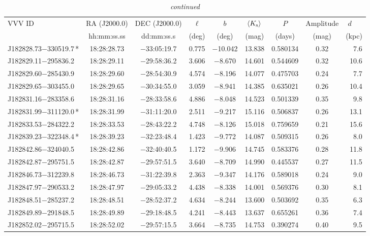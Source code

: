 \begin{table*}
\centering
\caption[]{{\it continued}}
\begin{tabular}{lcccccccr}
\hline \hline
VVV ID & RA (J2000.0)  & DEC (J2000.0) & $\ell$ & $b$ &  $\langle K_{\rm s} \rangle$ & $P$ & Amplitude & $d$~~~ \\
     & hh:mm:ss.ss    & dd:mm:ss.s   &  (deg) & (deg) &   (mag)       & (days) & (mag) & (kpc)   \\
\hline
J182828.73$-$330519.7\,* & 18:28:28.73 & $-$33:05:19.7 &  0.775 & $-$10.042 & 13.838 & 0.580134 & 0.32 & 7.6 \\
J182829.11$-$295836.2 & 18:28:29.11 & $-$29:58:36.2 &  3.606 & $-$8.670 & 14.601 & 0.544609 & 0.32 & 10.6 \\
J182829.60$-$285430.9 & 18:28:29.60 & $-$28:54:30.9 &  4.574 & $-$8.196 & 14.077 & 0.475703 & 0.24 & 7.7 \\
J182829.65$-$303455.0 & 18:28:29.65 & $-$30:34:55.0 &  3.059 & $-$8.941 & 14.385 & 0.635021 & 0.26 & 10.4 \\
J182831.16$-$283358.6 & 18:28:31.16 & $-$28:33:58.6 &  4.886 & $-$8.048 & 14.523 & 0.501339 & 0.35 & 9.8 \\
J182831.99$-$311120.0\,* & 18:28:31.99 & $-$31:11:20.0 &  2.511 & $-$9.217 & 15.116 & 0.506837 & 0.26 & 13.1 \\
J182833.53$-$284322.2 & 18:28:33.53 & $-$28:43:22.2 &  4.748 & $-$8.126 & 15.018 & 0.759659 & 0.21 & 15.6 \\
J182839.23$-$322348.4\,* & 18:28:39.23 & $-$32:23:48.4 &  1.423 & $-$9.772 & 14.087 & 0.509315 & 0.26 & 8.0 \\
J182842.86$-$324040.5 & 18:28:42.86 & $-$32:40:40.5 &  1.172 & $-$9.906 & 14.745 & 0.583376 & 0.28 & 11.8 \\
J182842.87$-$295751.5 & 18:28:42.87 & $-$29:57:51.5 &  3.640 & $-$8.709 & 14.990 & 0.445537 & 0.27 & 11.5 \\
J182846.73$-$312239.8 & 18:28:46.73 & $-$31:22:39.8 &  2.363 & $-$9.347 & 14.176 & 0.589018 & 0.24 & 9.0 \\
J182847.97$-$290533.2 & 18:28:47.97 & $-$29:05:33.2 &  4.438 & $-$8.338 & 14.001 & 0.569376 & 0.30 & 8.1 \\
J182848.51$-$285237.2 & 18:28:48.51 & $-$28:52:37.2 &  4.634 & $-$8.244 & 13.600 & 0.503692 & 0.35 & 6.3 \\
J182849.89$-$291848.5 & 18:28:49.89 & $-$29:18:48.5 &  4.241 & $-$8.443 & 13.637 & 0.655261 & 0.36 & 7.4 \\
J182852.02$-$295715.5 & 18:28:52.02 & $-$29:57:15.5 &  3.664 & $-$8.735 & 14.753 & 0.390274 & 0.40 & 9.5 \\

\end{tabular}
\end{table*}

